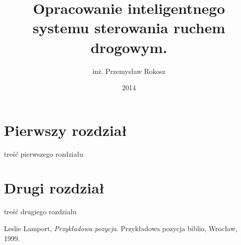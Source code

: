 \documentclass[printmode]{mgr}
\author{inż. Przemysław Rokosz}
\title{Opracowanie inteligentnego systemu sterowania ruchem drogowym.}
\date{2014}
\begin{document}
\maketitle
\tableofcontents

\chapter{Pierwszy rozdział}
treść pierwszego rozdziału
\chapter{Drugi rozdział}
treść drugiego rozdziału

\begin{thebibliography}{99}
 
  Leslie Lamport,
  \emph{Przykładowa pozycja}.
  Przykładowa pozycja biblio, Wrocław,
  1999.
 
\end{thebibliography}
\end{document}

